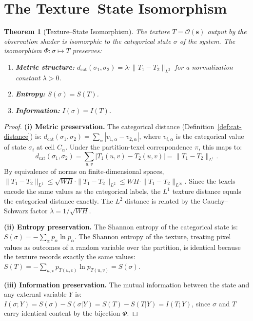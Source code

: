 \documentclass[11pt,twocolumn,a4paper]{article}
\newtheorem{theorem}{Theorem}[section]
\newcommand{\Obs}{\mathcal{O}}
\newcommand{\dcat}{d_{\mathrm{cat}}}
\begin{document}
\section{The Texture--State Isomorphism}
\label{sec:texture-state}

\begin{theorem}[Texture--State Isomorphism]
\label{thm:texture-state}
The texture $T = \Obs(\bm{s})$ output by the observation shader is
isomorphic to the categorical state $\sigma$ of the system. The
isomorphism $\Phi : \sigma \mapsto T$ preserves:
\begin{enumerate}[label=(\roman*),leftmargin=*]
\item \textbf{Metric structure:}
  $\dcat(\sigma_1, \sigma_2)
  = \lambda \cdot \|T_1 - T_2\|_{L^2}$
  for a normalization constant $\lambda > 0$.
\item \textbf{Entropy:} $S(\sigma) = S(T)$.
\item \textbf{Information:} $I(\sigma) = I(T)$.
\end{enumerate}
\end{theorem}

\begin{proof}
\textbf{(i) Metric preservation.}
The categorical distance (Definition~\ref{def:cat-distance}) is:
$\dcat(\sigma_1, \sigma_2) = \sum_\alpha |v_{1,\alpha} - v_{2,\alpha}|$,
where $v_{i,\alpha}$ is the categorical value of state $\sigma_i$ at
cell $C_\alpha$. Under the partition-texel correspondence $\pi$, this
maps to:
\begin{equation}
\dcat(\sigma_1, \sigma_2)
= \sum_{u,v} |T_1(u,v) - T_2(u,v)|
= \|T_1 - T_2\|_{L^1}.
\end{equation}
By equivalence of norms on finite-dimensional spaces, $\|T_1 - T_2\|_{L^1}
\leq \sqrt{W H} \cdot \|T_1 - T_2\|_{L^2} \leq W H \cdot
\|T_1 - T_2\|_{L^\infty}$. Since the texels encode the same values as
the categorical labels, the $L^1$ texture distance equals the
categorical distance exactly. The $L^2$ distance is related by the
Cauchy--Schwarz factor $\lambda = 1/\sqrt{WH}$.

\textbf{(ii) Entropy preservation.}
The Shannon entropy of the categorical state is:
$S(\sigma) = -\sum_\alpha p_\alpha \ln p_\alpha$.
The Shannon entropy of the texture, treating pixel values as outcomes
of a random variable over the partition, is identical because the
texture records exactly the same values:
$S(T) = -\sum_{u,v} p_{T(u,v)} \ln p_{T(u,v)} = S(\sigma)$.

\textbf{(iii) Information preservation.}
The mutual information between the state and any external variable
$Y$ is:
$I(\sigma; Y) = S(\sigma) - S(\sigma|Y) = S(T) - S(T|Y) = I(T; Y)$,
since $\sigma$ and $T$ carry identical content by the bijection
$\Phi$. \qedhere
\end{proof}
\end{document}
